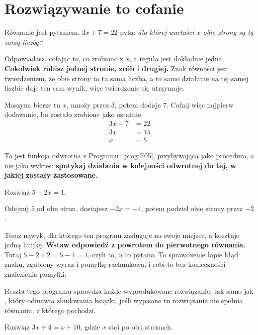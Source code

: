 \section{Rozwiązywanie to cofanie}
\label{sec:F06-undoing}

\begin{fr}
Równanie jest pytaniem. $3x + 7 = 22$ pyta: \emph{dla której wartości $x$ obie
strony są tą samą liczbą?}

Odpowiadasz, cofając to, co zrobiono z $x$, a reguła jest dokładnie jedna.
\textbf{Cokolwiek robisz jednej stronie, zrób i drugiej.} Znak równości jest
twierdzeniem, że obie strony to ta sama liczba, a to samo działanie na tej
samej liczbie daje ten sam wynik, więc twierdzenie się utrzymuje.

Maszyna bierze tu $x$, mnoży przez $3$, potem dodaje $7$. Cofnij więc najpierw
dodawanie, bo zostało zrobione jako ostatnie:
\begin{align*}
3x + 7 &= 22 \\
3x &= 15 \\
x &= 5
\end{align*}

To jest funkcja odwrotna z Programu~\ref{prog:F05}, przybywająca jako
procedura, a nie jako wykres: \textbf{spotykaj działania w kolejności
odwrotnej do tej, w jakiej zostały zastosowane.}

Rozwiąż $5 - 2x = 1$.
\nextframe
\end{fr}

\begin{fr}
Odejmij $5$ od obu stron, dostajesz $-2x = -4$, potem podziel obie strony przez
$-2$.

Teraz nawyk, dla którego ten program zasługuje na swoje miejsce, a kosztuje
jedną linijkę. \textbf{Wstaw odpowiedź z powrotem do pierwotnego równania.}
Tutaj $5 - 2 \times 2 = 5 - 4 = 1$, czyli to, o co pytano. To sprawdzenie
łapie błąd znaku, zgubiony wyraz i pomyłkę rachunkową, i robi to bez
konieczności znalezienia pomyłki.

Reszta tego programu sprawdza każde wyprodukowane rozwiązanie, tak samo jak
, który odmawia zbudowania książki, jeśli
wypisane tu rozwiązanie nie spełnia równania, z którego pochodzi.

Rozwiąż $3x + 4 = x + 10$, gdzie $x$ stoi po obu stronach.
\nextframe
\end{fr}

